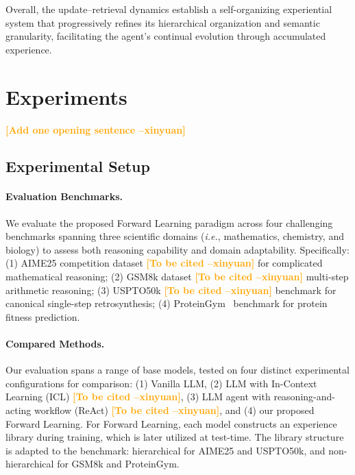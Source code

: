 \documentclass{article}
\newcommand{\method}{Forward Learning}
\newcommand{\xinyuan}[1]{\textcolor{orange}{\bf \small [#1 --xinyuan]}}
\begin{document}
Overall, the update–retrieval dynamics establish a self-organizing experiential system that progressively refines its hierarchical organization and semantic granularity, facilitating the agent’s continual evolution through accumulated experience.

\clearpage

\section{Experiments}
\xinyuan{Add one opening sentence}
\subsection{Experimental Setup}
\paragraph{Evaluation Benchmarks.}
We evaluate the proposed \method{} paradigm across four challenging benchmarks spanning three scientific domains (\textit{i.e.}, mathematics, chemistry, and biology) to assess both reasoning capability and domain adaptability. Specifically: (1) AIME25 competition dataset \xinyuan{To be cited} for complicated mathematical reasoning; (2) GSM8k dataset \xinyuan{To be cited} multi-step arithmetic reasoning; (3) USPTO50k \xinyuan{To be cited} benchmark for canonical single-step retrosynthesis; (4) ProteinGym~\cite{notin2023proteingym} benchmark for protein fitness prediction. 

\paragraph{Compared Methods.}
Our evaluation spans a range of base models, tested on four distinct experimental configurations for comparison: (1) Vanilla LLM, (2) LLM with In-Context Learning (ICL) \xinyuan{To be cited}, (3) LLM agent with reasoning-and-acting workflow (ReAct) \xinyuan{To be cited}, and (4) our proposed \method{}. For \method{}, each model constructs an experience library during training, which is later utilized at test-time. The library structure is adapted to the benchmark: hierarchical  for AIME25 and USPTO50k, and non-hierarchical for GSM8k and ProteinGym.
\end{document}
